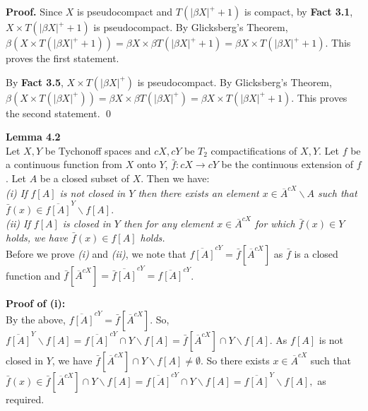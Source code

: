 \documentclass{article}
\begin{document}
\vskip 20pt


\textbf{Proof.} Since $X$ is pseudocompact and  $T(|\beta X|^+ +1)$ is compact, by \textbf{Fact 3.1}, $X\times T(|\beta X|^+ +1)$ is pseudocompact. By Glicksberg's Theorem, $\beta(X\times T(|\beta X|^+ +1))=\beta X\times \beta T(|\beta X|^+ +1)=\beta X\times T(|\beta X|^+ +1).$ This proves the first statement.
\vskip 15pt

By \textbf{Fact 3.5}, $X\times T(|\beta X|^+)$ is pseudocompact. By Glicksberg's Theorem, $\beta(X\times T(|\beta X|^+))=\beta X\times \beta T(|\beta X|^+)=\beta X\times T(|\beta X|^+ +1)$. This proves the second statement. \qed

\vskip 40pt


\textbf{Lemma 4.2}\\
 Let $X,Y$ be Tychonoff spaces and $cX, cY$ be $T_2$ compactifications of $X,Y$.
 Let $f$ be a continuous function from $X$ onto $Y$, $\bar{f}: cX\rightarrow cY$ be the continuous extension of $f$. Let $A$ be a closed subset of $X$. Then we have: \\
\emph{(i) If $f[A]$ is not closed in $Y$ then there exists an element $x\in \overline{A}^{cX} \backslash A$ such that $\bar{f}(x) \in \overline{f[A]}^{Y}\backslash f[A].$}\\
\emph{(ii) If $f[A]$ is closed in $Y$ then for any element $x \in \overline{A}^{cX} $ for which $\bar{f}(x)\in Y $ holds, we have $\bar{f}(x) \in f[A]$ holds.}\\

\vskip 20pt
Before we prove \emph{(i)} and \emph{(ii)}, we note that $\overline{f[A]}^{cY} = \bar{f}\left[\overline{A}^{cX}\right]$ as $\bar{f}$ is a closed function and $\bar{f}\left[\overline{A}^{cX}\right]=\overline{\bar{f}[A]}^{cY}=\overline{f[A]}^{cY}$. 

\vskip 20pt

\textbf{Proof of (i): }\\ 
By the above,  $\overline{f[A]}^{cY} = \bar{f}\left[\overline{A}^{cX}\right]$. So, $\overline{f[A]}^Y\backslash f[A]=\overline{f[A]}^{cY}\cap Y \backslash f[A] = \bar{f}\left[\overline{A}^{cX}\right] \cap Y \backslash f[A].$ \vskip 10pt
As $f[A]$ is not closed in $Y$, we have $\bar{f}\left[\overline{A}^{cX}\right]\cap Y\backslash f[A]\neq \emptyset$. So there exists $x\in \overline{A}^{cX}$ such that $\bar{f}(x)\in \bar{f}\left[\overline{A}^{cX}\right]\cap Y\backslash f[A]=\overline{f[A]}^{cY}\cap Y \backslash f[A]=\overline{f[A]}^Y\backslash f[A],$ as required.
\end{document}
